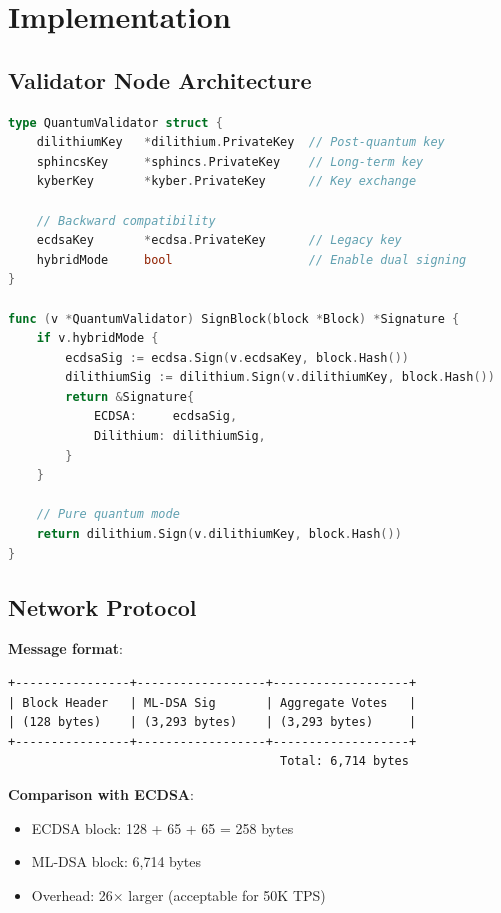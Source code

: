 \section{Implementation}


\subsection{Validator Node Architecture}

\begin{lstlisting}[language=Go]
type QuantumValidator struct {
    dilithiumKey   *dilithium.PrivateKey  // Post-quantum key
    sphincsKey     *sphincs.PrivateKey    // Long-term key
    kyberKey       *kyber.PrivateKey      // Key exchange
    
    // Backward compatibility
    ecdsaKey       *ecdsa.PrivateKey      // Legacy key
    hybridMode     bool                   // Enable dual signing
}

func (v *QuantumValidator) SignBlock(block *Block) *Signature {
    if v.hybridMode {
        ecdsaSig := ecdsa.Sign(v.ecdsaKey, block.Hash())
        dilithiumSig := dilithium.Sign(v.dilithiumKey, block.Hash())
        return &Signature{
            ECDSA:     ecdsaSig,
            Dilithium: dilithiumSig,
        }
    }
    
    // Pure quantum mode
    return dilithium.Sign(v.dilithiumKey, block.Hash())
}
\end{lstlisting}

\subsection{Network Protocol}

\textbf{Message format}:
\begin{verbatim}
+----------------+------------------+-------------------+
| Block Header   | ML-DSA Sig       | Aggregate Votes   |
| (128 bytes)    | (3,293 bytes)    | (3,293 bytes)     |
+----------------+------------------+-------------------+
                                      Total: 6,714 bytes
\end{verbatim}

\textbf{Comparison with ECDSA}:
\begin{itemize}
    \item ECDSA block: 128 + 65 + 65 = 258 bytes
    \item ML-DSA block: 6,714 bytes
    \item Overhead: 26$\times$ larger (acceptable for 50K TPS)
\end{itemize}

